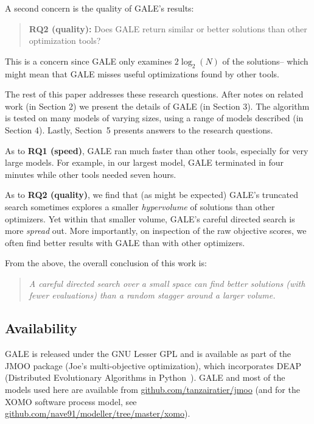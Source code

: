 \documentclass[10pt,journal,compsoc]{IEEEtran}
\newenvironment{changed}{\par\color{MyDarkBlue}}{\par}
\begin{document}
A second 
concern  is the quality of GALE's results:
\begin{quote}
{\bf RQ2 (quality):} Does GALE return similar or better
solutions than other optimization tools?
\end{quote}
This is a concern since GALE only examines $2\log_2(N)$ of the solutions--
which might mean that GALE misses  useful optimizations
 found by other tools.




The rest of this paper addresses these  research questions.
After  notes on related work (in Section 2)
we present the  details of GALE (in Section 3). 
The algorithm is  tested on many models of varying sizes, using
a range of models described (in Section 4).
Lastly, Section~5 presents answers to the research questions.

As to {\bf RQ1 (speed)}, GALE ran much faster than
other tools, especially for very large models.
For example, 
in our largest model, GALE terminated in four minutes
while other tools needed seven hours.
\begin{changed}
As to {\bf RQ2 (quality)}, we find that
(as might be expected)
GALE's truncated search sometimes explores a smaller  {\em hypervolume}  of 
solutions than other optimizers.
Yet within that smaller volume,   GALE's careful directed search
is more {\em spread} out. More importantly, on inspection of  the raw objective scores,
we often find better results with GALE than with other optimizers. 

From the above, the overall conclusion of this work is:
\begin{quote} {\em
A careful directed search over a small space can find better solutions (with fewer
evaluations)
than a random stagger around a larger volume.}
\end{quote}

\end{changed}


\subsection{Availability}\label{sec:avail}

GALE is released under the GNU Lesser GPL and is available
as part of the JMOO package (Joe's multi-objective optimization), which
incorporates DEAP (Distributed Evolutionary Algorithms in Python~\cite{jmlr12}).
GALE and most of the models used here are available 
from \url{github.com/tanzairatier/jmoo} (and for the XOMO software process model, see
\url{github.com/nave91/modeller/tree/master/xomo}).
\end{document}
